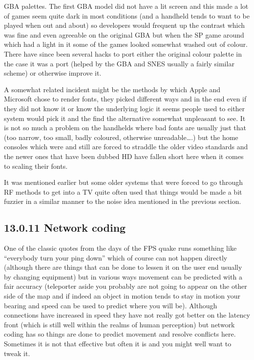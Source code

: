 \documentclass[
]{book}
\begin{document}
GBA palettes. The first GBA model did not have a lit screen and this made a lot of games seem quite dark in most conditions (and a handheld tends to want to be played when out and about) so developers would frequent up the contrast which was fine and even agreeable on the original GBA but when the SP game around which had a light in it some of the games looked somewhat washed out of colour. There have since been several hacks to port either the original colour palette in the case it was a port (helped by the GBA and SNES usually a fairly similar scheme) or otherwise improve it.

A somewhat related incident might be the methods by which Apple and Microsoft chose to render fonts, they picked different ways and in the end even if they did not know it or know the underlying logic it seems people used to either system would pick it and the find the alternative somewhat unpleasant to see. It is not so much a problem on the handhelds where bad fonts are usually just that (too narrow, too small, badly coloured, otherwise unreadable\ldots.) but the home consoles which were and still are forced to straddle the older video standards and the newer ones that have been dubbed HD have fallen short here when it comes to scaling their fonts.

It was mentioned earlier but some older systems that were forced to go through RF methods to get into a TV quite often used that things would be made a bit fuzzier in a similar manner to the noise idea mentioned in the previous section.

\hypertarget{network-coding}{%
\subsection{13.0.11 Network coding}\label{network-coding}}

One of the classic quotes from the days of the FPS quake runs something like ``everybody turn your ping down'' which of course can not happen directly (although there are things that can be done to lessen it on the user end usually by changing equipment) but in various ways movement can be predicted with a fair accuracy (teleporter aside you probably are not going to appear on the other side of the map and if indeed an object in motion tends to stay in motion your bearing and speed can be used to predict where you will be). Although connections have increased in speed they have not really got better on the latency front (which is still well within the realms of human perception) but network coding has so things are done to predict movement and resolve conflicts here. Sometimes it is not that effective but often it is and you might well want to tweak it.
\end{document}
